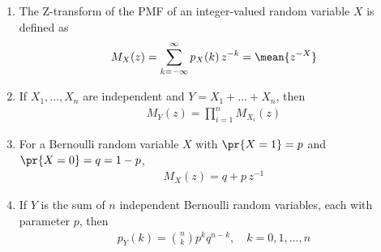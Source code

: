 
\renewcommand{\theHequation}{\thesubsection.\arabic{enumi}.\arabic{equation}}
\renewcommand{\theHfigure}{\thesubsection.\arabic{enumi}.\arabic{figure}}
\renewcommand{\theHtable}{\thesubsection.\arabic{enumi}.\arabic{table}}

\begin{enumerate}[label=\thesubsection.\arabic*, ref=\thesubsection.\theenumi]

\item The Z-transform of the PMF of an integer-valued random variable $X$
is defined as
\begin{align}
M_X(z) = \sum_{k=-\infty}^{\infty} p_X(k)\, z^{-k} = \mean{z^{-X}}
\label{eq:ztrans-def}
\end{align}

\item If $X_1, \dots, X_n$ are independent and $Y = X_1 + \dots + X_n$, then
\begin{align}
M_Y(z) = \prod_{i=1}^{n} M_{X_i}(z)
\label{eq:ztrans-prod}
\end{align}

\item For a Bernoulli random variable $X$ with $\pr{X = 1} = p$ and
$\pr{X = 0} = q = 1 - p$,
\begin{align}
M_X(z) = q + p\, z^{-1}
\label{eq:ztrans-bern}
\end{align}

\item If $Y$ is the sum of $n$ independent Bernoulli random variables, each
with parameter $p$, then
\begin{align}
p_Y(k) = \binom{n}{k} p^k q^{n-k}, \quad k = 0, 1, \dots, n
\label{eq:binom-pmf}
\end{align}


\end{enumerate}
